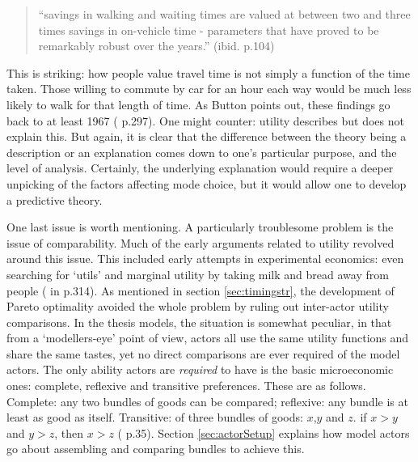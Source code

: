 \begin{quote}
``savings in walking and waiting times are valued at between two and three times savings in on-vehicle time - parameters that have proved to be remarkably robust over the years.'' (ibid. p.104)
\end{quote}

This is striking: how people value travel time is not simply a function of the time taken. Those willing to commute by car for an hour each way would be much less likely to walk for that length of time. As Button points out, these findings go back to at least 1967 (\citealt{quarmby_choice_1967} p.297). One might counter: utility describes but does not explain this. But again, it is clear that the difference between the theory being a description or an explanation comes down to one's particular purpose, and the level of analysis. Certainly, the underlying explanation would require a deeper unpicking of the factors affecting mode choice, but it would allow one to develop a predictive theory.

One last issue is worth mentioning. A particularly troublesome problem is the issue of comparability. Much of the early arguments related to utility revolved around this issue. This included early attempts in experimental economics: even searching for `utils' and marginal utility by taking milk and bread away from people (\citealt{fisher_statistical_1927} in \citealt{blaug_economic_1997} p.314). As mentioned in section \ref{sec:timingstr}, the development of Pareto optimality avoided the whole problem by ruling out inter-actor utility comparisons. In the thesis models, the situation is somewhat peculiar, in that from a `modellers-eye' point of view, actors all use the same utility functions and share the same tastes, yet no direct comparisons are ever required of the model actors. The only ability actors are \emph{required} to have is the basic microeconomic ones: complete, reflexive and transitive preferences. These are as follows. Complete: any two bundles of goods can be compared; reflexive: any bundle is at least as good as itself. Transitive: of three bundles of goods: $x$,$y$ and $z$. if $x>y$ and $y>z$, then $x > z$ (\citealt{varian_intermediate_2006} p.35). Section \ref{sec:actorSetup} explains how model actors go about assembling and comparing bundles to achieve this.

